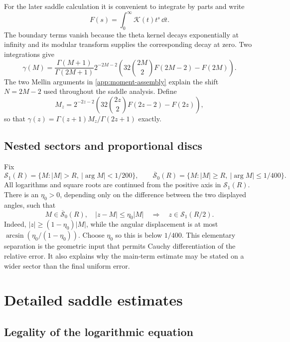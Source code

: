 For the later saddle calculation it is convenient to integrate by parts and
write
\[
 F(s)=\int_0^\infty\mathcal K(t)t^s\,\dd t.
\]
The boundary terms vanish because the theta kernel decays exponentially at
infinity and its modular transform supplies the corresponding decay at
zero.  Two integrations give
\begin{equation}\label{app:moment-assembly}
 \gamma(M)=\frac{\Gamma(M+1)}{\Gamma(2M+1)}2^{-2M-2}
 \left(32\binom{2M}{2}F(2M-2)-F(2M)\right).
\end{equation}
The two Mellin arguments in \eqref{app:moment-assembly} explain the shift
$N=2M-2$ used throughout the saddle analysis.
Define
\[
 M_z=2^{-2z-2}\left(32\binom{2z}{2}F(2z-2)-F(2z)\right),
\]
so that $\gamma(z)=\Gamma(z+1)M_z/\Gamma(2z+1)$ exactly.

\subsection{Nested sectors and proportional discs}

Fix
\[
 \mathcal S_1(R)=\{M:|M|>R,\ |\arg M|<1/200\},\qquad
 \overline{\mathcal S}_0(R)
 =\{M:|M|\ge R,\ |\arg M|\le1/400\}.
\]
All logarithms and square roots are continued from the positive axis in
$\mathcal S_1(R)$.  There is an $\eta_0>0$, depending only on the difference
between the two displayed angles, such that
\begin{equation}\label{app:sector-disc}
 M\in\overline{\mathcal S}_0(R),\quad |z-M|\le\eta_0|M|
 \quad\Longrightarrow\quad z\in\mathcal S_1(R/2).
\end{equation}
Indeed, $|z|\ge(1-\eta_0)|M|$, while the angular displacement is at most
$\arcsin(\eta_0/(1-\eta_0))$.  Choose $\eta_0$ so this is below $1/400$.
This elementary separation is the geometric input that permits Cauchy
differentiation of the relative error.  It also explains why the main-term
estimate may be stated on a wider sector than the final uniform error.

\section{Detailed saddle estimates}\label{app:saddle-details}

\subsection{Legality of the logarithmic equation}

